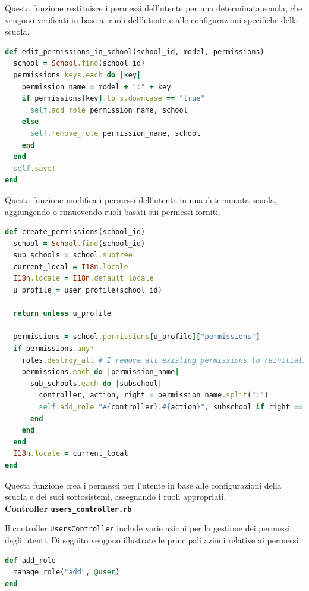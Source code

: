 \documentclass[a4paper, 12pt]{book}
\begin{document}
Questa funzione restituisce i permessi dell'utente per una determinata scuola, che vengono
verificati in base ai ruoli dell'utente e alle configurazioni specifiche della scuola.\\

\begin{lstlisting}[language=Ruby, caption=Funzione \texttt{edit\_permissions\_in\_school}]
def edit_permissions_in_school(school_id, model, permissions)
  school = School.find(school_id)
  permissions.keys.each do |key|
    permission_name = model + ":" + key
    if permissions[key].to_s.downcase == "true"
      self.add_role permission_name, school
    else
      self.remove_role permission_name, school
    end
  end
  self.save!
end
\end{lstlisting}

Questa funzione modifica i permessi dell'utente in una determinata scuola, aggiungendo o
rimuovendo ruoli basati sui permessi forniti.\\

\begin{lstlisting}[language=Ruby, caption=Funzione \texttt{create\_permissions}]
def create_permissions(school_id)
  school = School.find(school_id)
  sub_schools = school.subtree
  current_local = I18n.locale
  I18n.locale = I18n.default_locale
  u_profile = user_profile(school_id)

  return unless u_profile

  permissions = school.permissions[u_profile]["permissions"]
  if permissions.any?
    roles.destroy_all # I remove all existing permissions to reinitialise it
    permissions.each do |permission_name|
      sub_schools.each do |subschool|
        controller, action, right = permission_name.split(":")
        self.add_role "#{controller}:#{action}", subschool if right == "T"
      end
    end
  end
  I18n.locale = current_local
end
\end{lstlisting}

Questa funzione crea i permessi per l'utente in base alle configurazioni della scuola e
dei suoi sottosistemi, assegnando i ruoli appropriati.\\

\textbf{Controller \texttt{users\_controller.rb}}

Il controller \texttt{UsersController} include varie azioni per la gestione dei permessi degli utenti.
Di seguito vengono illustrate le principali azioni relative ai permessi.\\

\begin{lstlisting}[language=Ruby, caption=Azione \texttt{add\_role}]
def add_role
  manage_role("add", @user)
end
\end{lstlisting}
\end{document}
